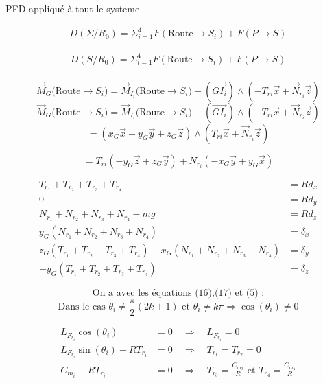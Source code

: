 \documentclass[a4paper,12pt]{report}  %
\begin{document}
PFD appliqué à tout le systeme


\begin{align}
	D(\Sigma/R_0) = \Sigma_{i=1}^{4}{F}(\text{Route} \rightarrow S_i) + {F}(P \rightarrow S) 
\end{align}



\begin{align}
	D(S/R_0) = \Sigma_{i=1}^{4}{F}(\text{Route} \rightarrow S_i) + {F}(P \rightarrow S) \\
\end{align}


$$
\vec{M}_{G}({\text{Route} \rightarrow S_i)} = \vec{M}_{I_i}({\text{Route}\rightarrow S_i)} + \left( \overrightarrow{GI_i} \right) \wedge (-{T}_{ri}\vec{x} + \vec{N}_{r_i} \vec{z})
$$
$$
\vec{M}_{G}({\text{Route} \rightarrow S_i)} = \vec{M}_{I_i}({\text{Route}\rightarrow S_i)} + \left( \overrightarrow{GI_i} \right) \wedge (-{T}_{ri}\vec{x} + \vec{N}_{r_i} \vec{z})
$$
$$
=(x_G \vec{x} + y_G \vec{y} + z_G \vec{z}) \wedge ({T}_{ri}\vec{x} + \vec{N}_{r_i} \vec{z}) 
$$

$$
={T}_{ri}(-y_G \vec{z} + z_G \vec{y}) + N_{r_i}(-x_G\vec{y} +  y_G\vec{x}) 
$$

\begin{align}
	T_{r_1}+T_{r_2}+T_{r_3}+T_{r_4} &= Rd_x \tag{13}\\
	0 &= Rd_y \tag{14} \\
	N_{r_1}+N_{r_2}+N_{r_3}+N_{r_4}-mg &= Rd_z \tag{15} \\
	y_G(N_{r_1}+N_{r_2}+N_{r_3}+N_{r_4}) &= δ_x \tag{16} \\
	z_G(T_{r_1}+T_{r_2}+T_{r_3}+T_{r_4}) - x_G(N_{r_1}+N_{r_2}+N_{r_3}+N_{r_4}) &= δ_y \tag{17} \\
	-y_G(T_{r_1}+T_{r_2}+T_{r_3}+T_{r_4}) &= δ_z \tag{18}
\end{align}






$$
\text{On a avec les équations (16),(17) et (5) :}
$$
$$
\text{Dans le cas } \theta_i \neq \frac{\pi}{2}(2k+1)\text{ et } \theta_i \neq k\pi 
\Rightarrow \cos(\theta_i) \neq 0
$$


\begin{align}
	L_{F_{r_i}} \cos(\theta_i) &= 0 \quad \Rightarrow \quad L_{F_{r_i}} = 0 \\
	L_{F_{r_i}} \sin(\theta_i) + R T_{r_i} &= 0 \quad \Rightarrow \quad T_{r_1} = T_{r_2} = 0 \\
	C_{m_i} - R T_{r_i} &= 0 \quad \Rightarrow \quad T_{r_3} = \frac{C_{m_3}}{R} \text{ et } T_{r_4} = \frac{C_{m_4}}{R}
\end{align}
\end{document}
